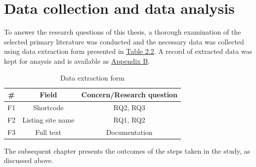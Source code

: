 \section{Data collection and data analysis}
To answer the research questions of this thesis, a thorough examination of the selected primary literature was conducted and the necessary data was collected using data extraction form presented in \hyperref[table:extraction]{Table 2.2}. A record of extracted data was kept for anaysis and is available as \hyperref[appendix:b]{Appendix B}.

\begin{table}[t]
	\begin{center}
		\begin{tabular}{||c c c||} 
			\hline
			\# & Field & Concern/Research question \\
			\hline
			F1 & Shortcode & RQ2, RQ3 \\
			F2 & Listing site name & RQ1, RQ2 \\
			F3 & Full text &  Documentation\\
			\hline
		\end{tabular}
		\caption{Data extraction form}
		\label{table:extraction}
	\end{center}
\end{table}

The subsequent chapter presents the outcomes of the steps taken in the study, as discussed above.